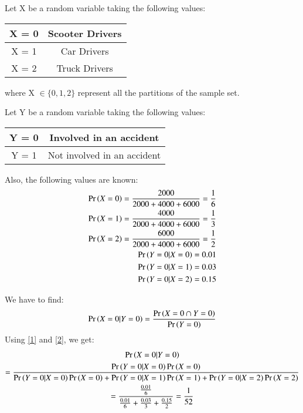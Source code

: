 \documentclass[journal,12pt,twocolumn]{IEEEtran}
\begin{document}
Let X be a random variable taking the following values:
\begin{center}
\begin{tabular}{ |c|c| } 
 \hline
 X = 0 & Scooter Drivers\\
 \hline
 X = 1 & Car Drivers\\
 \hline
X = 2 & Truck Drivers\\
 \hline
\end{tabular}
\end{center}
where X $\in \{0, 1, 2\}$ represent all the partitions of the sample set.
\par
\vspace{\baselineskip}
\vspace{\baselineskip}
\vspace{\baselineskip}
\vspace{\baselineskip}
\vspace{\baselineskip}
\vspace{\baselineskip}


Let Y be a random variable taking the following values:
\begin{center}
\begin{tabular}{ |c|c| } 
 \hline
 Y = 0 & Involved in an accident\\
 \hline
 Y = 1 & Not involved in an accident\\
 \hline
\end{tabular}
\end{center}

\par
\vspace{\baselineskip}
 Also, the following values are known:
\begin{align}
\Pr\left(X = 0\right) = \frac{2000}{2000+4000+6000} = \frac{1}{6}\\
\Pr\left(X = 1\right) = \frac{4000}{2000+4000+6000} = \frac{1}{3}\\
\Pr\left(X = 2\right) = \frac{6000}{2000+4000+6000} = \frac{1}{2}\\
\Pr\left(Y = 0|X = 0\right) = 0.01\\
\Pr\left(Y = 0|X = 1\right) = 0.03\\
\Pr\left(Y = 0|X = 2\right) = 0.15
\end{align}

\vspace{\baselineskip}
We have to find:
\begin{align}
\Pr\left(X = 0|Y = 0\right) = \frac{\Pr\left(X = 0 \cap Y = 0\right)}{\Pr\left(Y = 0\right)}
\end{align}
Using \eqref{1} and \eqref{2}, we get:
{\scriptsize
\begin{multline}
\Pr\left(X = 0|Y = 0\right) 
\\
= \frac{\Pr\left(Y = 0|X = 0\right)\Pr\left(X = 0\right)}{\Pr\left(Y = 0|X = 0\right)\Pr\left(X = 0\right)+\Pr\left(Y = 0|X = 1\right)\Pr\left(X = 1\right)+\Pr\left(Y = 0|X = 2\right)\Pr\left(X = 2\right)}
\\
= \frac{\frac{0.01}{6}}{\frac{0.01}{6} + \frac{0.03}{3} + \frac{0.15}{2}}
 = \frac{1}{52}
\end{multline}
}
\end{document}

